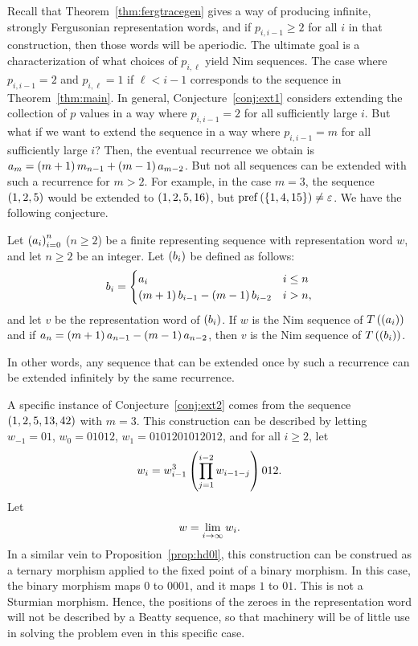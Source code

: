 \documentclass[english,12pt]{article}
\newcommand{\seq}{\p}
\DeclareMathOperator{\pref}{pref}
\begin{document}
Recall that Theorem~\ref{thm:fergtracegen} gives a way of producing infinite, strongly Fergusonian representation words, and if $p_{i,i-1}\geq2$ for all $i$ in that construction, then those words will be aperiodic.  The ultimate goal is a characterization of what choices of $p_{i,\ell}$ yield Nim sequences.  The case where $p_{i,i-1}=2$ and $p_{i,\ell}=1$ if $\ell<i-1$ corresponds to the sequence in Theorem~\ref{thm:main}.  In general, Conjecture~\ref{conj:ext1} considers extending the collection of $p$ values in a way where $p_{i,i-1}=2$ for all sufficiently large $i$.  But what if we want to extend the sequence in a way where $p_{i,i-1}=m$ for all sufficiently large $i$?  Then, the eventual recurrence we obtain is $a_m=\left(m+1\right)m_{n-1}+\left(m-1\right)a_{m-2}$.  But not all sequences can be extended with such a recurrence for $m>2$.  For example, in the case $m=3$, the sequence $\seq{1,2,5}$ would be extended to $\left(1,2,5,16\right)$, but $\pref\p{\st{1,4,15}}\neq\eps$.  We have the following conjecture.
\begin{conj}\label{conj:ext2}
Let $\seq{a_i}_{i=0}^n$ ($n\geq2$) be a finite representing sequence with representation word $w$, and let $n\geq2$ be an integer.  Let $\seq{b_i}$ be defined as follows:
\[
b_i=\begin{cases}
a_i & i\leq n\\
\left(m+1\right)b_{i-1}-\left(m-1\right)b_{i-2} & i>n,
\end{cases}
\]
and let $v$ be the representation word of $\seq{b_i}$.  If $w$ is the Nim sequence of $T\p{\seq{a_i}}$ and if $a_n=\left(m+1\right)a_{n-1}-\left(m-1\right)a_{n-2}$, then $v$ is the Nim sequence of $T\p{\seq{b_i}}$.
\end{conj}
In other words, any sequence that can be extended once by such a recurrence can be extended infinitely by the same recurrence.

A specific instance of Conjecture~\ref{conj:ext2} comes from the sequence $\left(1,2,5,13,42\right)$ with $m=3$.  This construction can be described by letting $w_{-1}=01$, $w_0=01012$, $w_1=0101201012012$, and for all $i\geq2$, let
\[
w_i=w_{i-1}^3\left(\prod_{j=1}^{i-2}w_{i-1-j}\right)012.
\]
Let
\[
w=\lim_{i\rightarrow\infty}{w_i}.
\]
In a similar vein to Proposition~\ref{prop:hd0l}, this construction can be construed as a ternary morphism applied to the fixed point of a binary morphism.  In this case, the binary morphism maps $0$ to $0001$, and it maps $1$ to $01$.  This is not a Sturmian morphism.  Hence, the positions of the zeroes in the representation word will not be described by a Beatty sequence, so that machinery will be of little use in solving the problem even in this specific case.
\end{document}
